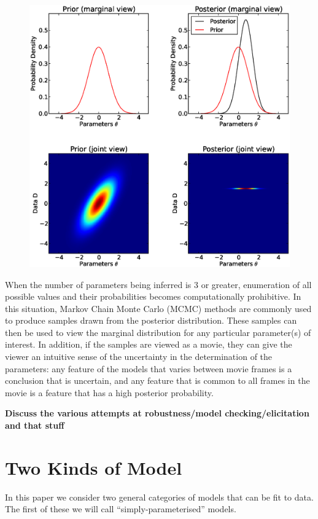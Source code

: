 \documentclass[letterpaper, 11pt]{article}
\begin{document}
\begin{figure}
\begin{center}
\includegraphics[scale=0.5]{joint_marginal.eps}
\end{center}
\end{figure}

When the number of parameters being inferred is 3 or greater, enumeration of
all possible values and their probabilities becomes computationally prohibitive.
In this situation,
Markov Chain Monte Carlo (MCMC) methods are commonly used to produce samples
drawn from the posterior distribution. These samples can then be used to view
the marginal distribution for any particular parameter(s) of interest.
In addition, if the
samples are viewed as a movie, they can give the viewer an intuitive sense of
the uncertainty in the determination of the parameters: any feature of the
models that varies between movie frames is a conclusion that is uncertain, and any
feature that is common to all frames in the movie is a feature that has a high
posterior probability.

{\bf Discuss the various attempts at robustness/model checking/elicitation and that stuff}

\section{Two Kinds of Model}
In this paper we consider two general categories of models that can be fit to
data. The first of these we will call ``simply-parameterised'' models.
\end{document}
